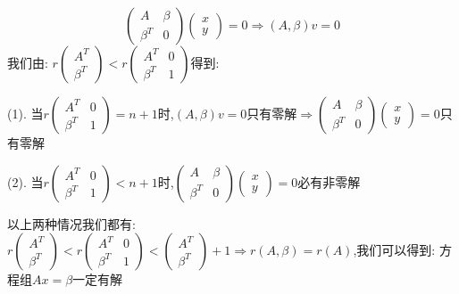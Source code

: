 \begin{solution}

	$$\left( \begin{matrix}
		A&\beta\\\beta^T&0
	\end{matrix}\right)\left( \begin{matrix}
		x\\y
	\end{matrix}\right)=0\Rightarrow (A,\beta)v=0$$
	我们由:  $r\left( \begin{matrix}
		A^T\\\beta^T
	\end{matrix}\right)<r\left( \begin{matrix}
		A^T&0\\\beta^T&1
	\end{matrix}\right)$得到:  

	(1). 当$r\left( \begin{matrix}
		A^T&0\\\beta^T&1
	\end{matrix}\right)=n+1$时,$(A,\beta)v=0$只有零解$\Rightarrow \left( \begin{matrix}
	A&\beta\\\beta^T&0
\end{matrix}\right)\left( \begin{matrix}
x\\y
\end{matrix}\right)=0$只有零解

	(2). 当$r\left( \begin{matrix}
		A^T&0\\\beta^T&1
	\end{matrix}\right)<n+1$时,$\left( \begin{matrix}
	A&\beta\\\beta^T&0
\end{matrix}\right)\left( \begin{matrix}
x\\y
\end{matrix}\right)=0$必有非零解

	以上两种情况我们都有:  $r\left( \begin{matrix}
		A^T\\\beta^T
	\end{matrix}\right)<r\left( \begin{matrix}
		A^T&0\\\beta^T&1
	\end{matrix}\right)<\left( \begin{matrix}
	A^T\\\beta^T
\end{matrix}\right)+1\Rightarrow r(A,\beta)=r(A)$,我们可以得到:  方程组$Ax=\beta$一定有解
\end{solution}


